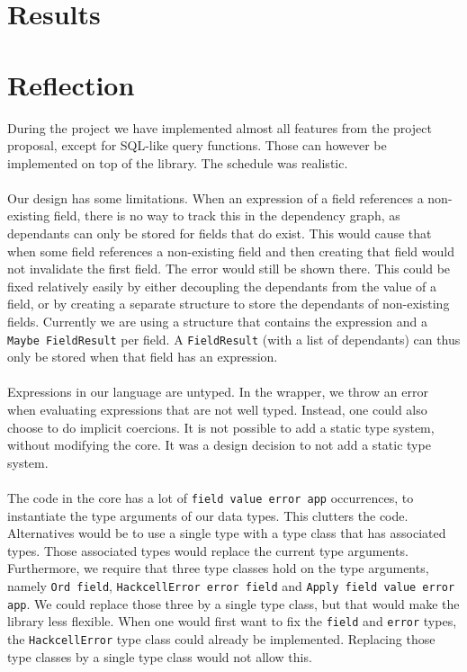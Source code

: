 \documentclass{article}
\begin{document}
	\section{Results}
	
	\section{Reflection}
	During the project we have implemented almost all features from the project proposal, except for SQL-like query functions. Those can however be implemented on top of the library. The schedule was realistic.
\\\\	
	Our design has some limitations. When an expression of a field references a non-existing field, there is no way to track this in the dependency graph, as dependants can only be stored for fields that do exist. This would cause that when some field references a non-existing field and then creating that field would not invalidate the first field. The error would still be shown there. This could be fixed relatively easily by either decoupling the dependants from the value of a field, or by creating a separate structure to store the dependants of non-existing fields. Currently we are using a structure that contains the expression and a \texttt{Maybe FieldResult} per field. A \texttt{FieldResult} (with a list of dependants) can thus only be stored when that field has an expression.
\\\\	
	Expressions in our language are untyped. In the wrapper, we throw an error when evaluating expressions that are not well typed. Instead, one could also choose to do implicit coercions. It is not possible to add a static type system, without modifying the core. It was a design decision to not add a static type system.
\\\\
	The code in the core has a lot of \texttt{field value error app} occurrences, to instantiate the type arguments of our data types. This clutters the code. Alternatives would be to use a single type with a type class that has associated types. Those associated types would replace the current type arguments. Furthermore, we require that three type classes hold on the type arguments, namely \texttt{Ord field}, \texttt{HackcellError error field} and \texttt{Apply field value error app}. We could replace those three by a single type class, but that would make the library less flexible. When one would first want to fix the \texttt{field} and \texttt{error} types, the \texttt{HackcellError} type class could already be implemented. Replacing those type classes by a single type class would not allow this.
\end{document}
